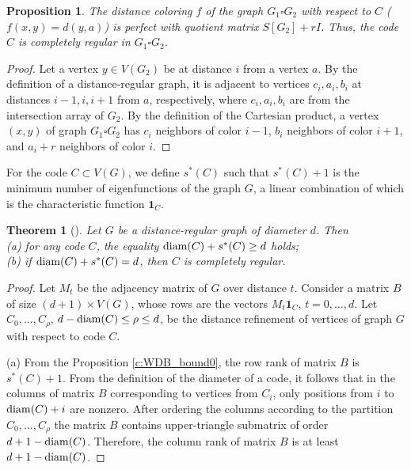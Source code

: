 \documentclass[11pt]{article}
\newtheorem{theorem}{Theorem}[section]
\newtheorem{claim}{Proposition}[section]
\theoremstyle{definition}
\begin{document}
{{\begin{claim}
The distance coloring $f$ of the graph $G_1\square G_2$ with respect to 
$C$ ($f(x,y)=d(y,a)$) is perfect with quotient matrix
$S[G_2]+rI$. Thus, the code $C$ is completely regular in
 $G_1\square G_2$.
\end{claim}
\begin{proof}
Let a vertex $y\in V(G_2)$ be at distance $i$ from a vertex
$a$. By the definition of a distance-regular graph,
it is adjacent to vertices $c_i,a_i,b_i$ at distances $i-1,i,i+1$ from
$a$, respectively, where  $c_i,a_i,b_i$ are from the intersection array of $G_2$. By the definition of the Cartesian product,
a vertex $(x,y)$ of graph $G_1\square G_2$ has $c_i$ neighbors of color $i-1$, $b_i$ neighbors of color
$i+1$, and $a_i+r$ neighbors of color $i$.
\end{proof}







For the code $C\subset V(G)$, we define $s^*(C)$ such that $s^*(C)+1$
is the minimum number of eigenfunctions of the graph $G$, a linear
combination of which is the characteristic function ${\mathbf 1}_C$.

\begin{theorem}[\cite{BGKM}]
Let $G$ be a distance-regular graph of diameter $d$. Then\\
{\rm (a)} for any code $C$, the equality ${\rm
diam}(C)+s^*(C)\geq d$ holds;\\
{\rm (b)} if ${\rm diam}(C)+s^*(C)= d$, then $C$ is completely
regular.
\end{theorem}
\begin{proof}
Let $M_t$ be the adjacency matrix of $G$ over distance $t$.
Consider a matrix $B$ of size $(d+1)\times V(G)$, whose rows
are the vectors $M_t{\mathbf 1}_{C}$, $t=0,\dots,d$. Let
$C_{0},\dots,C_{\rho}$, $d-{\rm diam}(C)\leq \rho\leq d$, be the distance refinement of vertices of graph $G$
with respect to code $C$.

(a) From the Proposition \ref{c:WDB_bound0}, the row rank
of matrix $B$ is $s^*(C)+1$. From the definition of the diameter of a code, it follows
that in the columns of matrix $B$ corresponding to vertices from $C_i$, only positions from $i$ to ${\rm diam}(C)+i$ are nonzero. After ordering the columns according to the partition $C_{0},\dots,C_{\rho}$ the matrix $B$ contains upper-triangle submatrix of order $d+1-{\rm diam}(C)$.
Therefore, the column rank of matrix $B$ is at least $d+1-{\rm diam}(C)$.


\end{proof}}}
\end{document}
